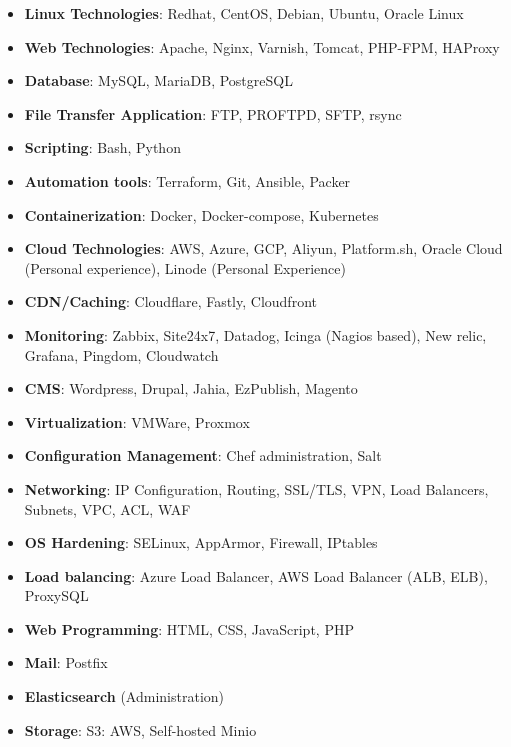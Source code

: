 \documentclass[10pt,a4paper,ragged2e,withhyper]{altacv}
\begin{document}
\begin{paracol}{2}
\begin{itemize}[left=0pt]
    \item \textbf{\textcolor{PastelRed}{Linux Technologies}}: Redhat, CentOS, Debian, Ubuntu, Oracle Linux
    \item \textbf{\textcolor{PastelRed}{Web Technologies}}: Apache, Nginx, Varnish, Tomcat, PHP-FPM, HAProxy
    \item \textbf{\textcolor{PastelRed}{Database}}: MySQL, MariaDB, PostgreSQL
    \item \textbf{\textcolor{PastelRed}{File Transfer Application}}: FTP, PROFTPD, SFTP, rsync
    \item \textbf{\textcolor{PastelRed}{Scripting}}: Bash, Python
    \item \textbf{\textcolor{PastelRed}{Automation tools}}: Terraform, Git, Ansible, Packer
    \item \textbf{\textcolor{PastelRed}{Containerization}}: Docker, Docker-compose, Kubernetes
    \item \textbf{\textcolor{PastelRed}{Cloud Technologies}}: AWS, Azure, GCP, Aliyun, Platform.sh, Oracle Cloud (Personal experience), Linode (Personal Experience)
    \item \textbf{\textcolor{PastelRed}{CDN/Caching}}: Cloudflare, Fastly, Cloudfront
    \item \textbf{\textcolor{PastelRed}{Monitoring}}: Zabbix, Site24x7, Datadog, Icinga (Nagios based), New relic, Grafana, Pingdom, Cloudwatch
    \item \textbf{\textcolor{PastelRed}{CMS}}: Wordpress, Drupal, Jahia, EzPublish, Magento
    \item \textbf{\textcolor{PastelRed}{Virtualization}}: VMWare, Proxmox
    \item \textbf{\textcolor{PastelRed}{Configuration Management}}: Chef administration, Salt
    \item \textbf{\textcolor{PastelRed}{Networking}}: IP Configuration, Routing, SSL/TLS, VPN, Load Balancers, Subnets, VPC, ACL, WAF
    \item \textbf{\textcolor{PastelRed}{OS Hardening}}: SELinux, AppArmor, Firewall, IPtables
    \item \textbf{\textcolor{PastelRed}{Load balancing}}: Azure Load Balancer, AWS Load Balancer (ALB, ELB), ProxySQL
    \item \textbf{\textcolor{PastelRed}{Web Programming}}: HTML, CSS, JavaScript, PHP
    \item \textbf{\textcolor{PastelRed}{Mail}}: Postfix
    \item \textbf{\textcolor{PastelRed}{Elasticsearch}} (Administration)
    \item \textbf{\textcolor{PastelRed}{Storage}}: S3: AWS, Self-hosted Minio
\end{itemize}


\end{paracol}
\end{document}
